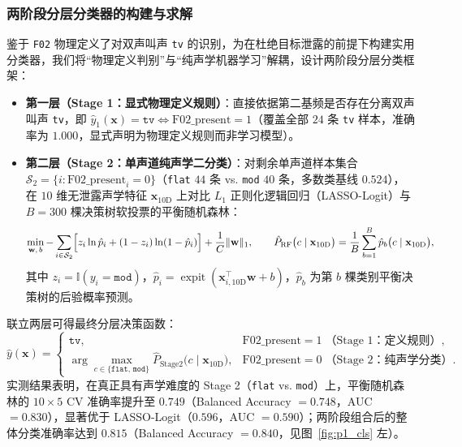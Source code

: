 \documentclass{apmcmthesis}
\begin{document}
\subsubsection{两阶段分层分类器的构建与求解}

鉴于 \texttt{F02} 物理定义了对双声叫声 \texttt{tv} 的识别，为在杜绝目标泄露的前提下构建实用分类器，我们将``物理定义判别''与``纯声学机器学习''解耦，设计两阶段分层分类框架：
\begin{itemize}
    \item \textbf{第一层（Stage 1：显式物理定义规则）}：直接依据第二基频是否存在分离双声叫声 \texttt{tv}，即 $\hat{y}_1(\mathbf{x}) = \texttt{tv} \iff \text{F02\_present} = 1$（覆盖全部 $24$ 条 \texttt{tv} 样本，准确率为 $1.000$，显式声明为物理定义规则而非学习模型）。
    \item \textbf{第二层（Stage 2：单声道纯声学二分类）}：对剩余单声道样本集合 $\mathcal{S}_2 = \{i : \text{F02\_present}_i = 0\}$（\texttt{flat} $44$ 条 vs. \texttt{mod} $40$ 条，多数类基线 $0.524$），在 $10$ 维无泄露声学特征 $\mathbf{x}_{10\text{D}}$ 上对比 $L_1$ 正则化逻辑回归（LASSO-Logit）与 $B=300$ 棵决策树软投票的平衡随机森林：
    \begin{equation}
        \min_{\mathbf{w},\,b} -\sum_{i \in \mathcal{S}_2}\Bigl[z_i \ln \hat{p}_i + (1 - z_i)\ln(1 - \hat{p}_i)\Bigr] + \frac{1}{C}\|\mathbf{w}\|_1, \qquad
        \hat{P}_{\text{RF}}\bigl(c \mid \mathbf{x}_{10\text{D}}\bigr) = \frac{1}{B}\sum_{b=1}^{B} \hat{p}_b\bigl(c \mid \mathbf{x}_{10\text{D}}\bigr),
    \end{equation}
    其中 $z_i = \mathbb{I}(y_i = \texttt{mod})$，$\hat{p}_i = \operatorname{expit}(\mathbf{x}_{i,10\text{D}}^\top \mathbf{w} + b)$，$\hat{p}_b$ 为第 $b$ 棵类别平衡决策树的后验概率预测。
\end{itemize}
联立两层可得最终分层决策函数：
\begin{equation}
    \hat{y}(\mathbf{x}) =
    \begin{cases}
        \texttt{tv}, & \text{F02\_present} = 1\;\text{（Stage 1：定义规则）}, \\[4pt]
        \arg\max\limits_{c \in \{\texttt{flat},\,\texttt{mod}\}} \hat{P}_{\text{Stage2}}\bigl(c \mid \mathbf{x}_{10\text{D}}\bigr), & \text{F02\_present} = 0\;\text{（Stage 2：纯声学分类）}.
    \end{cases}
\end{equation}
实测结果表明，在真正具有声学难度的 Stage 2（\texttt{flat} vs. \texttt{mod}）上，平衡随机森林的 $10 \times 5$ CV 准确率提升至 $0.749$（Balanced Accuracy $= 0.748$，AUC $= 0.830$），显著优于 LASSO-Logit（$0.596$，AUC $= 0.590$）；两阶段组合后的整体分类准确率达到 $0.815$（Balanced Accuracy $= 0.840$，见图~\ref{fig:p1_cls} 左）。
\end{document}
